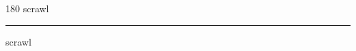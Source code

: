 
\begin{frame}
\begin{center}
\begin{turn}{180}
{\fontsize{2.5cm}{1em}\selectfont scrawl}
\end{turn}
\vspace{1em}\par  
\hrule
\vspace{1em}\par  
{\fontsize{2.5cm}{1em}\selectfont scrawl}
\end{center}
\end{frame}
